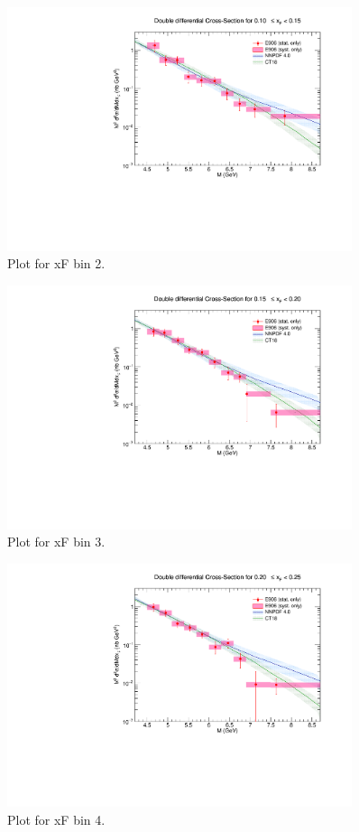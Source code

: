 \begin{figure}[p]
\centering
\includegraphics[width=0.9\textwidth]{./XSecPlots/LH2_2_roofit.pdf}
\caption{Plot for xF bin 2.}
\end{figure}
\clearpage

\begin{figure}[p]
\centering
\includegraphics[width=0.9\textwidth]{./XSecPlots/LH2_3_roofit.pdf}
\caption{Plot for xF bin 3.}
\end{figure}
\clearpage

\begin{figure}[p]
\centering
\includegraphics[width=0.9\textwidth]{./XSecPlots/LH2_4_roofit.pdf}
\caption{Plot for xF bin 4.}
\end{figure}
\clearpage

